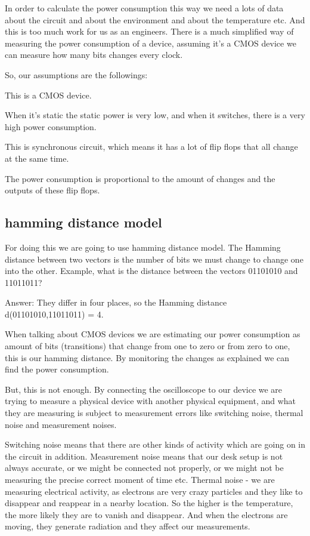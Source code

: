 In order to calculate the power consumption this way we need a lots of data about the circuit and about the environment and about the temperature etc. And this is too much work for us as an engineers. There is a much simplified way of measuring the power consumption of a device, assuming it's a CMOS device we can measure how many bits changes every clock.

So, our assumptions are the followings:
\begin{inparaenum}
    \item This is a CMOS device.
    \item When it's static the static power is very low, and when it switches, there is a very high power consumption.
    \item This is synchronous circuit, which means it has a lot of flip flops that all change at the same time.
    \item The power consumption is proportional to the amount of changes and the outputs of these flip flops.
\end{inparaenum}


\subsection { hamming distance model }

For doing this we are going to use hamming distance model. The Hamming distance between two vectors is the number of bits we must change to change one into the other. Example, what is the distance between the vectors 01101010 and 11011011? 

Answer: They differ in four places, so the Hamming distance d(01101010,11011011) = 4.

When talking about CMOS devices we are estimating our power consumption as amount of bits (transitions) that change from one to zero or from zero to one, this is our hamming distance. By monitoring the changes as explained we can find the power consumption.

But, this is not enough. By connecting the oscilloscope to our device we are trying to measure a physical device with another physical equipment, and what they are measuring is subject to measurement errors like switching noise, thermal noise and measurement noises.

Switching noise means that there are other kinds of activity which are going on in the circuit in addition. Measurement noise means that our desk setup is not always accurate, or we might be connected not properly, or we might not be measuring the precise correct moment of time etc. Thermal noise - we are measuring electrical activity, as electrons are very crazy particles and they like to disappear and reappear in a nearby location. So the higher is the temperature, the more likely they are to vanish and disappear. And when the electrons are moving, they generate radiation and they affect our measurements.

